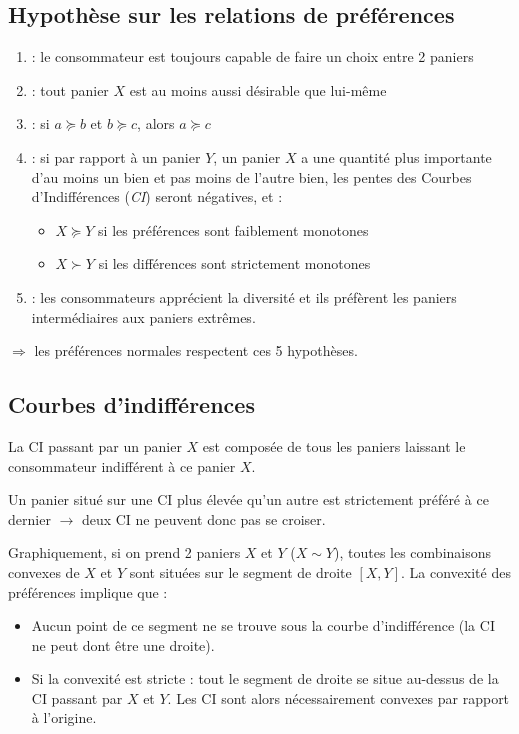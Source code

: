 \subsection{Hypothèse sur les relations de préférences}

\begin{enumerate}
\item {} : le consommateur est toujours capable de faire un choix entre 2 paniers
\item {} : tout panier $X$ est au moins aussi désirable que lui-même
\item {} : si $a \succeq b$ et $b \succeq c$, alors $a \succeq c$ 
\item {} : si par rapport à un panier $Y$, un panier $X$ a une quantité plus importante d'au moins un bien et pas moins de l'autre bien, les pentes des Courbes d'Indifférences (\textit{CI}) seront négatives, et :
	\begin{itemize}
	\item $X \succeq Y$ si les préférences sont faiblement monotones
	\item $X \succ Y$ si les différences sont strictement monotones
	\end{itemize}
\item {} : les consommateurs apprécient la diversité et ils préfèrent les paniers intermédiaires aux paniers extrêmes.
\end{enumerate}
$\Longrightarrow$ les préférences normales respectent ces 5 hypothèses.

\subsection{Courbes d'indifférences}

La CI passant par un panier $X$ est composée de tous les paniers laissant le consommateur indifférent à ce panier $X$.

Un panier situé sur une CI plus élevée qu'un autre est strictement préféré à ce dernier $\rightarrow$ deux CI ne peuvent donc pas se croiser.

Graphiquement, si on prend 2 paniers $X$ et $Y$ ($X \sim Y$), toutes les combinaisons convexes de $X$ et $Y$ sont situées sur le segment de droite $[X, Y]$. La convexité des préférences implique que : 
\begin{itemize}
\item Aucun point de ce segment ne se trouve sous la courbe d'indifférence (la CI ne peut dont être une droite).
\item Si la convexité est stricte : tout le segment de droite se situe au-dessus de la CI passant par $X$ et $Y$. Les CI sont alors nécessairement convexes par rapport à l'origine.
\end{itemize}

